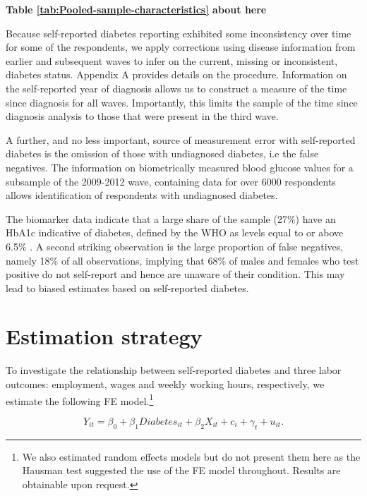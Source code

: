 \documentclass[12pt,english]{article}
\begin{document}
\begin{center}
	\textbf{Table \ref{tab:Pooled-sample-characteristics} about here}
\end{center}

Because self-reported diabetes reporting exhibited some inconsistency over time for some of the respondents, we apply corrections using disease information from earlier and subsequent waves to infer on the current, missing or inconsistent, diabetes status. Appendix A provides details on the procedure. Information on the self-reported year of diagnosis allows us to construct a measure of the time since diagnosis for all waves. Importantly, this limits the sample of the time since diagnosis analysis to those that were present in the third wave. 

A further, and no less important, source of measurement error with self-reported diabetes is the omission of those with undiagnosed diabetes, i.e the false negatives. The information on biometrically measured blood glucose values for a subsample of the 2009-2012 wave, containing data for over 6000 respondents allows identification of respondents with undiagnosed diabetes. 

The biomarker data indicate that a large share of the sample (27\%) have an \ac{HbA1c} indicative of diabetes, defined by the \ac{WHO} as levels equal to or above 6.5\% \parencite{WorldHealthOrganization2011}. A second striking observation is the large proportion of false negatives, namely 18\% of all observations, implying that 68\% of males and females who test positive do not self-report and hence are unaware of their condition. This may lead to biased estimates based on self-reported diabetes.





\section{\label{sec:Estimation Strategy}Estimation strategy}

To investigate the relationship between self-reported diabetes and three labor outcomes: employment, wages and weekly working hours, respectively, we estimate the following \acf{FE} model.\footnote{We also estimated random effects models but do not present them here as the Hausman test suggested the use of the FE model throughout. Results are obtainable upon request.}


\begin{equation}
Y_{it}=\beta_{0}+\beta_{1}Diabetes_{it}+\beta_{2}X_{it}+c_{i}+\gamma_{t}+u_{it}.\label{eq:cha4_employed}
\end{equation}
\end{document}
